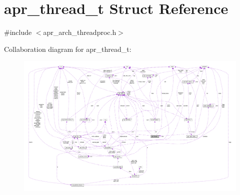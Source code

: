 \hypertarget{structapr__thread__t}{}\section{apr\+\_\+thread\+\_\+t Struct Reference}
\label{structapr__thread__t}


{\ttfamily \#include $<$apr\+\_\+arch\+\_\+threadproc.\+h$>$}



Collaboration diagram for apr\+\_\+thread\+\_\+t\+:
\nopagebreak
\begin{figure}[H]
\begin{center}
\leavevmode
\includegraphics[width=350pt]{structapr__thread__t__coll__graph}
\end{center}
\end{figure}

